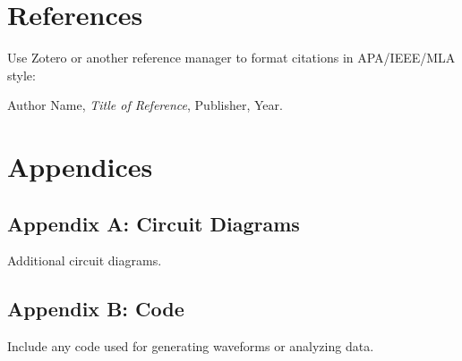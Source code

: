 \documentclass[a4paper,12pt]{article}
\begin{document}
\section{References}
Use Zotero or another reference manager to format citations in APA/IEEE/MLA style:
\begin{thebibliography}{99}
     Author Name, \textit{Title of Reference}, Publisher, Year.
\end{thebibliography}

\appendix
\section{Appendices}
\subsection{Appendix A: Circuit Diagrams}
Additional circuit diagrams.

\subsection{Appendix B: Code}
Include any code used for generating waveforms or analyzing data.
\end{document}
